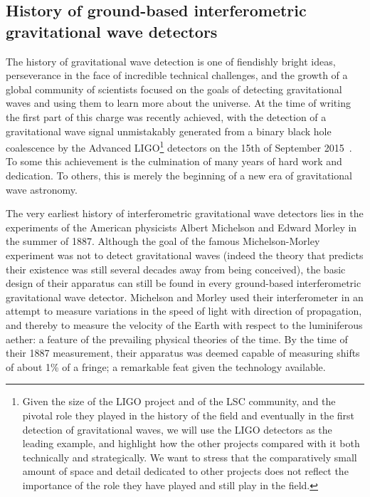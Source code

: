 \newpage
\subsection{History of ground-based interferometric gravitational wave detectors}\label{subsec:prehistory}

The history of gravitational wave detection is one of fiendishly bright ideas, perseverance in the face of incredible 
technical challenges, and the growth of a global community of scientists focused on the goals of detecting 
gravitational waves and using them to learn more about the universe. At the time of writing the first part of this 
charge was recently achieved, with the detection of a gravitational wave signal unmistakably generated from a binary 
black hole coalescence by the Advanced LIGO\footnote{Given the size of the LIGO project and of the LSC community, and the pivotal role they played in the history of the field and eventually in the first detection of gravitational waves, we will use the LIGO detectors as the leading example, and highlight how the other projects compared with it both technically and strategically. We want to stress that the comparatively small amount of space and detail dedicated to other projects does not reflect the importance of the role they have played and still play in the field.} 
 detectors on the 15th of September 2015~\cite{GW150914}. To 
some this achievement is the culmination of many years of hard work and dedication. To others, this is merely 
the beginning of a new era of gravitational wave astronomy. 

The very earliest history of interferometric gravitational wave detectors lies in the experiments 
of the American physicists Albert Michelson and Edward Morley in the summer of 1887. Although 
the goal of the famous Michelson-Morley experiment was not to detect gravitational waves (indeed 
the theory that predicts their existence was still several decades away from being conceived), the basic 
design of their apparatus can still be found in every ground-based interferometric gravitational wave detector. 
Michelson and Morley used their interferometer in an attempt to measure variations in the speed of 
light with direction of propagation, and thereby to measure the velocity of the Earth with respect to the 
luminiferous aether: a feature of the prevailing physical theories of the time. By the time of their 1887 measurement, 
their apparatus was deemed capable of measuring shifts of about 1\% of a fringe; a remarkable feat given the 
technology available. 

